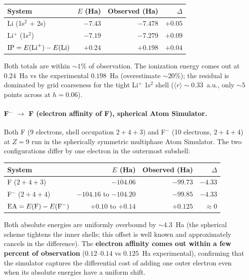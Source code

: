 \documentclass[11pt]{article}
\begin{document}
\begin{center}
\begin{tabular}{lrrr}
\toprule
System & $E$ (Ha) & Observed (Ha) & $\Delta$ \\
\midrule
Li (1s$^2$ + 2s) & $-7.43$ & $-7.478$ & $+0.05$ \\
Li$^+$ (1s$^2$)  & $-7.19$ & $-7.279$ & $+0.09$ \\
\midrule
$\mathrm{IP} = E({\rm Li}^+) - E({\rm Li})$ & $+0.24$ & $+0.198$ & $+0.04$ \\
\bottomrule
\end{tabular}
\end{center}

Both totals are within $\sim 1\%$ of observation. The ionization energy comes out at $0.24$~Ha vs the experimental $0.198$~Ha (overestimate $\sim 20\%$); the residual is dominated by grid coarseness for the tight Li$^+$ 1s$^2$ shell ($\langle r \rangle \sim 0.33$~a.u., only $\sim 5$ points across at $h = 0.06$).

\paragraph{F$^-$ $\to$ F (electron affinity of F), spherical Atom Simulator.}
Both F (9 electrons, shell occupation $2+4+3$) and F$^-$ (10 electrons, $2+4+4$) at $Z = 9$ run in the spherically symmetric multiphase Atom Simulator. The two configurations differ by one electron in the outermost subshell:

\begin{center}
\begin{tabular}{lrrr}
\toprule
System & $E$ (Ha) & Observed (Ha) & $\Delta$ \\
\midrule
F  ($2{+}4{+}3$) & $-104.06$       & $-99.73$  & $-4.33$ \\
F$^-$ ($2{+}4{+}4$) & $-104.16$ to $-104.20$ & $-99.85$ & $-4.33$ \\
\midrule
$\mathrm{EA} = E({\rm F}) - E({\rm F}^-)$ & $+0.10$ to $+0.14$ & $+0.125$ & $\approx 0$ \\
\bottomrule
\end{tabular}
\end{center}

Both absolute energies are uniformly overbound by $\sim 4.3$~Ha (the spherical scheme tightens the inner shells; this offset is well known and approximately cancels in the difference). The \textbf{electron affinity comes out within a few percent of observation} ($0.12$--$0.14$ vs $0.125$~Ha experimental), confirming that the simulator captures the differential cost of adding one outer electron even when its absolute energies have a uniform shift.
\end{document}
